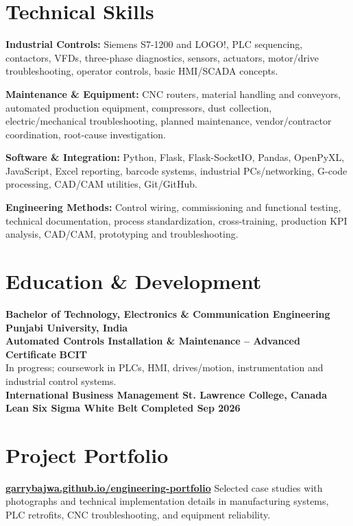 \documentclass[10pt,letterpaper]{article}
\newcommand{\focus}[2]{\textbf{#1:} #2\par}
\begin{document}
\section{Technical Skills}
\focus{Industrial Controls}{Siemens S7-1200 and LOGO!, PLC sequencing, contactors, VFDs, three-phase diagnostics, sensors, actuators, motor/drive troubleshooting, operator controls, basic HMI/SCADA concepts.}
\vspace{4pt}
\focus{Maintenance \& Equipment}{CNC routers, material handling and conveyors, automated production equipment, compressors, dust collection, electric/mechanical troubleshooting, planned maintenance, vendor/contractor coordination, root-cause investigation.}
\vspace{4pt}
\focus{Software \& Integration}{Python, Flask, Flask-SocketIO, Pandas, OpenPyXL, JavaScript, Excel reporting, barcode systems, industrial PCs/networking, G-code processing, CAD/CAM utilities, Git/GitHub.}
\vspace{4pt}
\focus{Engineering Methods}{Control wiring, commissioning and functional testing, technical documentation, process standardization, cross-training, production KPI analysis, CAD/CAM, prototyping and troubleshooting.}
\section{Education \& Development}
\textbf{Bachelor of Technology, Electronics \& Communication Engineering} \hfill \textbf{Punjabi University, India}\\[3pt]
\textbf{Automated Controls Installation \& Maintenance -- Advanced Certificate} \hfill \textbf{BCIT}\\[-1pt]
{\color{muted}In progress; coursework in PLCs, HMI, drives/motion, instrumentation and industrial control systems.}\\[3pt]
\textbf{International Business Management} \hfill \textbf{St. Lawrence College, Canada}\\[3pt]
\textbf{Lean Six Sigma White Belt} \hfill \textbf{Completed Sep 2026}
\section{Project Portfolio}
\href{https://garrybajwa.github.io/engineering-portfolio/}{\textbf{garrybajwa.github.io/engineering-portfolio}} \quad Selected case studies with photographs and technical implementation details in manufacturing systems, PLC retrofits, CNC troubleshooting, and equipment reliability.
\end{document}
